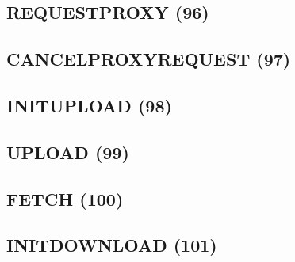 \subsection{REQUESTPROXY (96)}

\subsection{CANCELPROXYREQUEST (97)}

\subsection{INITUPLOAD (98)}

\subsection{UPLOAD (99)}

\subsection{FETCH (100)}

\subsection{INITDOWNLOAD (101)}
